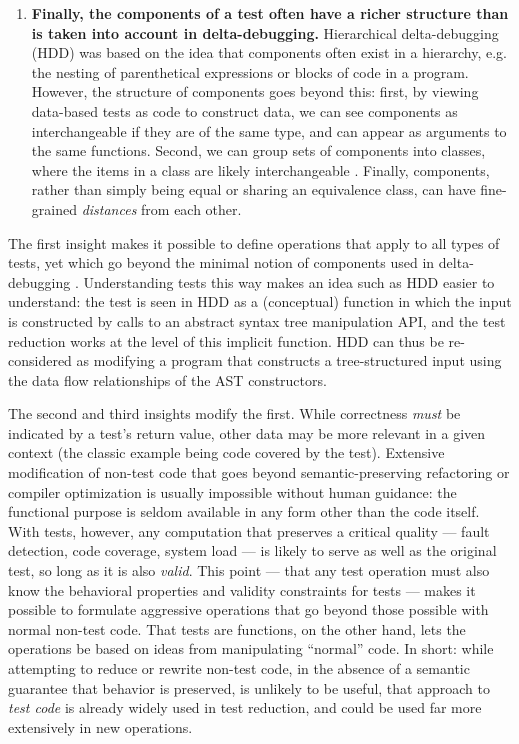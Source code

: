 \begin{enumerate}
\item {\bf Finally, the components of a test often have a richer structure
  than is taken into account in delta-debugging.}  Hierarchical
  delta-debugging (HDD) \cite{HDD} was based on the idea that components often exist in
  a hierarchy, e.g. the nesting of parenthetical expressions or blocks
  of code in a program.  However, the structure of components goes
  beyond this:  first, by viewing data-based tests as code to
  construct data, we can see components as interchangeable if they are
  of the same type, and can appear as arguments to the same
  functions.  Second, we can group sets of components into classes,
  where the items in a class are likely 
  interchangeable \cite{ISSTA12,helphelp}.  Finally, components, rather than
  simply being equal or sharing an equivalence class, can have
  fine-grained \emph{distances} from each other.
\end{enumerate}

The first insight makes it possible to define operations that apply to
all types of tests, yet which go beyond the minimal notion of components
used in delta-debugging \cite{DD}.  Understanding tests this way makes
an idea such as HDD easier to understand:  the
test is seen in HDD as a (conceptual) function in which
the input is constructed by calls to an abstract syntax tree
manipulation API, and the test reduction works at the level of this
implicit function.  HDD can thus be re-considered as modifying
a program that constructs a tree-structured input using the data
flow relationships of the AST constructors.

The second and third insights modify the first.  While correctness \emph{must} be indicated by a test's
return value, other data may be more relevant in a given context
(the classic example being code covered by the test).  Extensive
modification of non-test code that goes beyond semantic-preserving
refactoring or compiler optimization is usually impossible without human
guidance: the functional purpose is seldom available in any form other
than the code itself.  With tests, however, any
computation that preserves a critical quality ---
fault detection, code coverage, system load --- is likely to
serve as well as the original test, so long as it is also \emph{valid}.  This point --- that any test
operation must also know the behavioral properties and validity
constraints for tests --- makes it possible to formulate
aggressive operations that go beyond those possible with normal non-test
code.  That tests are functions, on the other hand, lets the operations be
based on ideas from manipulating ``normal'' code.  In short:  while
attempting to reduce or rewrite non-test code, in the absence of a
semantic guarantee that behavior is preserved, is unlikely to
be useful, that approach to \emph{test code} is already widely
used in test reduction, and could be used far more extensively in new operations.


